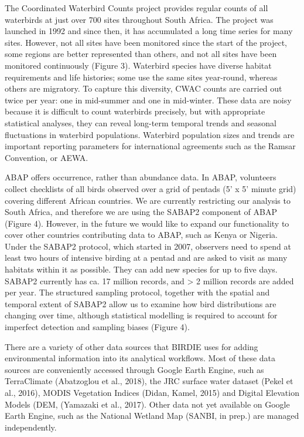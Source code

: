 \documentclass[utf8]{frontiersSCNS}
\begin{document}
The Coordinated Waterbird Counts project provides regular counts of all
waterbirds at just over 700 sites throughout South Africa. The project
was launched in 1992 and since then, it has accumulated a long time
series for many sites. However, not all sites have been monitored since
the start of the project, some regions are better represented than
others, and not all sites have been monitored continuously (Figure 3).
Waterbird species have diverse habitat requirements and life histories;
some use the same sites year-round, whereas others are migratory. To
capture this diversity, CWAC counts are carried out twice per year: one
in mid-summer and one in mid-winter. These data are noisy because it is
difficult to count waterbirds precisely, but with appropriate
statistical analyses, they can reveal long-term temporal trends and
seasonal fluctuations in waterbird populations. Waterbird population
sizes and trends are important reporting parameters for international
agreements such as the Ramsar Convention, or AEWA.

ABAP offers occurrence, rather than abundance data. In ABAP, volunteers
collect checklists of all birds observed over a grid of pentads (5' x 5'
minute grid) covering different African countries. We are currently
restricting our analysis to South Africa, and therefore we are using the
SABAP2 component of ABAP (Figure 4). However, in the future we would
like to expand our functionality to cover other countries contributing
data to ABAP, such as Kenya or Nigeria. Under the SABAP2 protocol, which
started in 2007, observers need to spend at least two hours of intensive
birding at a pentad and are asked to visit as many habitats within it as
possible. They can add new species for up to five days. SABAP2 currently
has ca. 17 million records, and \textgreater{} 2 million records are
added per year. The structured sampling protocol, together with the
spatial and temporal extent of SABAP2 allow us to examine how bird
distributions are changing over time, although statistical modelling is
required to account for imperfect detection and sampling biases (Figure
4).

There are a variety of other data sources that BIRDIE uses for adding
environmental information into its analytical workflows. Most of these
data sources are conveniently accessed through Google Earth Engine, such
as TerraClimate (Abatzoglou et al., 2018), the JRC surface water dataset
(Pekel et al., 2016), MODIS Vegetation Indices (Didan, Kamel, 2015) and
Digital Elevation Models (DEM, (Yamazaki et al., 2017). Other data not
yet available on Google Earth Engine, such as the National Wetland Map
(SANBI, in prep.) are managed independently.
\end{document}
